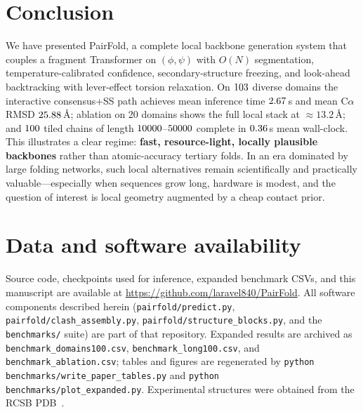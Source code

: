 \documentclass[11pt,a4paper]{article}
\begin{document}
\section{Conclusion}

We have presented PairFold, a complete local backbone generation system that couples a fragment Transformer on $(\phi,\psi)$ with $O(N)$ segmentation, temperature-calibrated confidence, secondary-structure freezing, and look-ahead backtracking with lever-effect torsion relaxation.
On $103{}$ diverse domains the interactive consensus+SS path achieves mean inference time $2.67{}$\,s and mean C$\alpha$ RMSD $25.88{}$\,\AA; ablation on 20 domains shows the full local stack at $\approx 13.2$\,\AA; and $100{}$ tiled chains of length $10000{}$--$50000{}$ complete in $0.36{}$\,s mean wall-clock.
This illustrates a clear regime: \textbf{fast, resource-light, locally plausible backbones} rather than atomic-accuracy tertiary folds.
In an era dominated by large folding networks, such local alternatives remain scientifically and practically valuable---especially when sequences grow long, hardware is modest, and the question of interest is local geometry augmented by a cheap contact prior.

\section*{Data and software availability}

Source code, checkpoints used for inference, expanded benchmark CSVs, and this manuscript are available at
\url{https://github.com/laravel840/PairFold}.
All software components described herein (\texttt{pairfold/predict.py}, \texttt{pairfold/clash\_assembly.py}, \texttt{pairfold/structure\_blocks.py}, and the \texttt{benchmarks/} suite) are part of that repository.
Expanded results are archived as \texttt{benchmark\_domains100.csv}, \texttt{benchmark\_long100.csv}, and \texttt{benchmark\_ablation.csv}; tables and figures are regenerated by \texttt{python benchmarks/write\_paper\_tables.py} and \texttt{python benchmarks/plot\_expanded.py}.
Experimental structures were obtained from the RCSB PDB~\citep{berman2000protein}.
\end{document}
